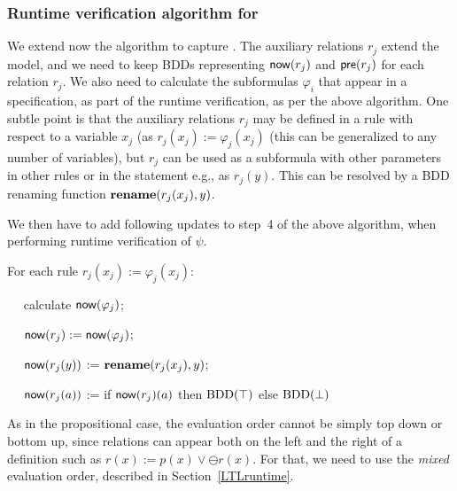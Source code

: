 \subsubsection{Runtime verification algorithm for \EPFLTL{}}

We extend now the algorithm to capture \EPFLTL{}.
The auxiliary relations $r_j$ extend the model, and we need to keep 
BDDs representing $\mathsf{now} ( r_j )$ and
$\mathsf{pre} (r_j)$ for each relation $r_j$. We also need to calculate the 
subformulas $\varphi_i$ that appear in
a specification, as part of the runtime verification,
as per the above \PFLTL{} algorithm. One subtle point is that the auxiliary 
relations $r_j$ may be defined in a rule with respect to
a variable $x_j$ (as $r_j (x_j ):= \varphi_j (x_j)$ (this can be generalized 
to any number of variables), but $r_j$ can be used
as a subformula with other parameters in other rules or in the statement e.g., 
as $r_j ( y )$. This can be resolved by a BDD renaming function 
$\mathbf{rename} ( r_j (x_j ) , y)$.


We then have to add
following updates to step~4 of the above algorithm, when performing runtime verification of
$\psi$. 

\noindent \begin{description}
\item For each rule 
$r_j ( x_j ) := \varphi_j ( x_j )$:
\item{\ \ }  calculate $\mathsf{now} ( \varphi_j )$;
\item{\ \ }  $\mathsf{now} ( r_j )  := \mathsf{now} (\varphi_j)$;
\item{\ \ } $\mathsf{now} ( r_j ( y ) )$ := $\mathbf{rename} ( r_j(x_j) ,  y )$;
\item{\ \ } $\mathsf{now} ( r_j ( a ) )$ := if $\mathsf{now} ( r_j ) ( a )$
then $\mathrm{BDD}(\top)$ else $\mathrm{BDD}(\bot)$
\end{description}


\noindent
As in the propositional case, the evaluation order cannot be
simply top down or bottom up, since relations can appear
both on the left and the right of a definition
such as $r ( x ) := p ( x ) \vee \ominus r ( x )$. For that,
we need to use the {\em mixed} evaluation order, described in Section~\ref{LTLruntime}.













